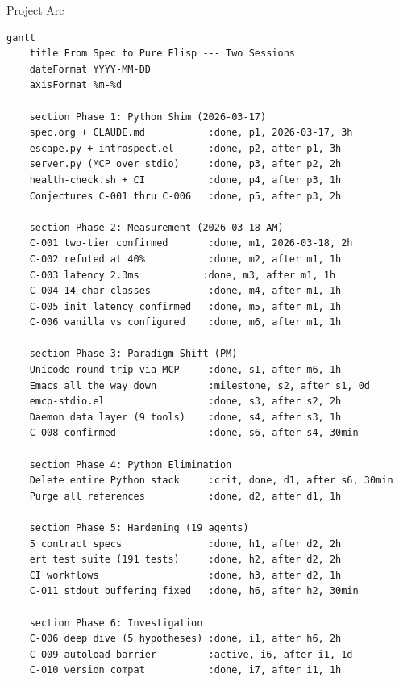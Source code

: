 \documentclass[presentation]{beamer}
\begin{document}
\begin{frame}[label={sec:orgaa6c89a},fragile]{Project Arc}
 \begin{verbatim}
gantt
    title From Spec to Pure Elisp --- Two Sessions
    dateFormat YYYY-MM-DD
    axisFormat %m-%d

    section Phase 1: Python Shim (2026-03-17)
    spec.org + CLAUDE.md           :done, p1, 2026-03-17, 3h
    escape.py + introspect.el      :done, p2, after p1, 3h
    server.py (MCP over stdio)     :done, p3, after p2, 2h
    health-check.sh + CI           :done, p4, after p3, 1h
    Conjectures C-001 thru C-006   :done, p5, after p3, 2h

    section Phase 2: Measurement (2026-03-18 AM)
    C-001 two-tier confirmed       :done, m1, 2026-03-18, 2h
    C-002 refuted at 40%           :done, m2, after m1, 1h
    C-003 latency 2.3ms           :done, m3, after m1, 1h
    C-004 14 char classes          :done, m4, after m1, 1h
    C-005 init latency confirmed   :done, m5, after m1, 1h
    C-006 vanilla vs configured    :done, m6, after m1, 1h

    section Phase 3: Paradigm Shift (PM)
    Unicode round-trip via MCP     :done, s1, after m6, 1h
    Emacs all the way down         :milestone, s2, after s1, 0d
    emcp-stdio.el                  :done, s3, after s2, 2h
    Daemon data layer (9 tools)    :done, s4, after s3, 1h
    C-008 confirmed                :done, s6, after s4, 30min

    section Phase 4: Python Elimination
    Delete entire Python stack     :crit, done, d1, after s6, 30min
    Purge all references           :done, d2, after d1, 1h

    section Phase 5: Hardening (19 agents)
    5 contract specs               :done, h1, after d2, 2h
    ert test suite (191 tests)     :done, h2, after d2, 2h
    CI workflows                   :done, h3, after d2, 1h
    C-011 stdout buffering fixed   :done, h6, after h2, 30min

    section Phase 6: Investigation
    C-006 deep dive (5 hypotheses) :done, i1, after h6, 2h
    C-009 autoload barrier         :active, i6, after i1, 1d
    C-010 version compat           :done, i7, after i1, 1h
\end{verbatim}
\end{frame}
\end{document}
